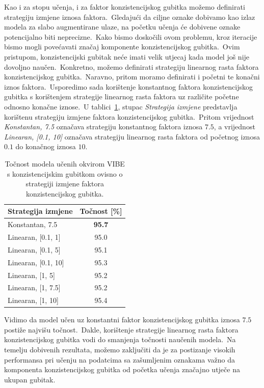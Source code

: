 \documentclass[diplomskirad]{fer}
\begin{document}
Kao i za stopu učenja, i za faktor konzistencijskog gubitka možemo definirati strategiju izmjene iznosa faktora.\ 
Gledajući da ciljne oznake dobivamo kao izlaz modela za slabo augmentirane ulaze, na početku učenja će dobivene oznake potencijalno biti neprecizne.\ 
Kako bismo doskočili ovom problemu, kroz iteracije bismo mogli povećavati značaj komponente konzistencijskog gubitka.\ Ovim pristupom, konzistencijski gubitak neće imati velik utjecaj kada model još nije dovoljno naučen.\ 
Konkretno, možemo definirati strategiju linearnog rasta faktora konzistencijskog gubitka.\ Naravno, pritom moramo definirati i početni te konačni iznos faktora.\
Usporedimo sada korištenje konstantnog faktora konzistencijskog gubitka s korištenjem strategije linearnog rasta faktora uz različite početne odnosno konačne iznose.\ 
U tablici~\ref{tbl:usporedba_con_rate_scheduler}, stupac \textit{Strategija izmjene} predstavlja korištenu strategiju izmjene faktora konzistencijskog gubitka.\ 
Pritom vrijednost \textit{Konstantan, 7.5} označava strategiju konstantnog faktora iznosa $7.5$, a vrijednost \textit{Linearan, [0.1, 10]} označava strategiju linearnog rasta faktora od početnog iznosa $0.1$ do konačnog iznosa $10$.\ 

\begin{table}[htb]
  \caption{Točnost modela učenih okvirom VIBE s konzistencijskim gubitkom ovisno o strategiji izmjene faktora konzistencijskog gubitka.}
  \label{tbl:usporedba_con_rate_scheduler}
  \centering
  \begin{tabular}{l||c}
  Strategija izmjene & Točnost [\%] \\ \hline \hline
  Konstantan, 7.5 & \textbf{95.7} \\
  Linearan, [0.1, 1] & 95.0 \\
  Linearan, [0.1, 5] & 95.1 \\
  Linearan, [0.1, 10] & 95.3 \\
  Linearan, [1, 5] & 95.2 \\
  Linearan, [1, 7.5] & 95.2 \\
  Linearan, [1, 10] & 95.4 \\
  \end{tabular}
\end{table}

Vidimo da model učen uz konstantni faktor konzistencijskog gubitka iznosa $7.5$ postiže najvišu točnost.\ 
Dakle, korištenje strategije linearnog rasta faktora konzistencijskog gubitka vodi do smanjenja točnosti naučenih modela.\ 
Na temelju dobivenih rezultata, možemo zaključiti da je za postizanje visokih performansa pri učenju na podatcima sa zašumljenim oznakama važno da komponenta konzistencijskog gubitka od početka učenja značajno utječe na ukupan gubitak.\ 
\end{document}
